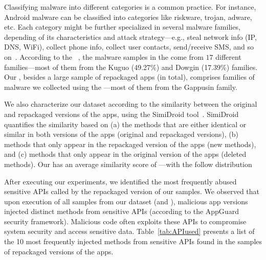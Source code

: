 Classifying malware into different categories is a common practice. For instance, Android malware can be classified into categories
like riskware, trojan, adware, etc. Each category might be further specialized in several malware families, depending of its
characteristics and attack strategy---e.g., steal network info (IP, DNS, WiFi), collect phone info,
collect user contacts, send/receive SMS, and so on~\cite{DBLP:conf/iccns/RahaliLKTGM20}.
According to the
\avt~\cite{avclass2-paper}, the malware samples in the \sds come from $17$ different families---most of them from the Kuguo (49.27\%) and Dowgin (17.39\%) families.  
Our \cds, besides a large sample of repackaged apps (\apps in total),
comprises  families of malware we collected using the \avt---most
of them from the Gappusin  family.

We also characterize our dataset according to the similarity
between the original and repackaged versions of the apps, using the  
SimiDroid tool~\cite{DBLP:conf/trustcom/0029BK17}. SimiDroid quantifies the similarity
based on (a) the methods that are either identical or similar in both versions of the apps (original and repackaged versions),
(b) methods that only appear in the repackaged version of the apps (new methods), and (c) methods that only appear in the
original version of the apps (deleted methods).
Our \cds has an average similarity score of ---with the follow distribution 


After executing our experiments, we identified the  most frequently abused sensitive APIs called by the repackaged version of our samples.
We observed that upon execution of all samples from our dataset (\sds and \cds), malicious app versions injected  distinct methods from sensitive APIs (according to the
AppGuard~\cite{DBLP:conf/esorics/BackesGHMS13} security framework).
Malicious code often exploits these APIs to compromise system security and access sensitive data. Table~\ref{tab:APIused}
presents a list of the 10 most frequently injected methods from sensitive APIs found in the
\cds samples of repackaged versions of the apps.

